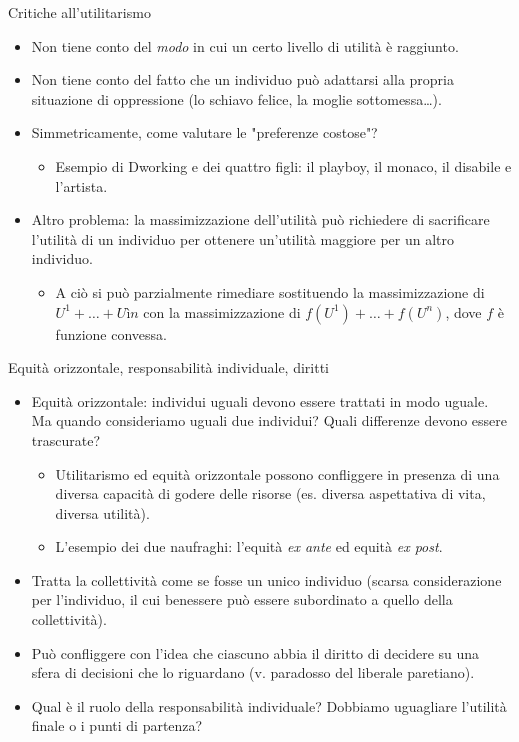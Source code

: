 \documentclass[11pt]{beamer}
\begin{document}
\begin{frame}{Critiche all'utilitarismo}
\begin{itemize}
\item Non tiene conto del \emph{modo} in cui un certo livello di utilità è raggiunto.
\item Non tiene conto del fatto che un individuo può adattarsi alla propria
situazione di oppressione (lo schiavo felice, la moglie sottomessa\ldots{}).
\item Simmetricamente, come valutare le "preferenze costose"?
\begin{itemize}
\item Esempio di Dworking e dei quattro figli: il playboy, il monaco, il
disabile e l'artista.
\end{itemize}
\item Altro problema: la massimizzazione dell'utilità può richiedere di
sacrificare l'utilità di un individuo per ottenere un'utilità maggiore per
un altro individuo.
\begin{itemize}
\item A ciò si può parzialmente rimediare sostituendo la massimizzazione di
$U^1+\dots+Uìn$ con la massimizzazione di $f(U^1)+\dots+f(U^n)$, dove $f$
è funzione convessa.
\end{itemize}
\end{itemize}
\end{frame}

\begin{frame}{Equità orizzontale, responsabilità individuale, diritti}
\begin{itemize}
\item \alert{Equità orizzontale}: individui uguali devono essere trattati in modo
uguale. Ma quando consideriamo uguali due individui? Quali differenze
devono essere trascurate?
\begin{itemize}
\item Utilitarismo ed equità orizzontale possono confliggere in presenza di una
diversa capacità di godere delle risorse (es. diversa aspettativa di vita,
diversa utilità).
\item L'esempio dei due naufraghi: l'equità \emph{ex ante} ed equità \emph{ex post}.
\end{itemize}
\item Tratta la collettività come se fosse un unico individuo (scarsa
considerazione per l'individuo, il cui benessere può essere subordinato a
quello della collettività).
\item Può confliggere con l'idea che ciascuno abbia il diritto di decidere su una
sfera di decisioni che lo riguardano (v. paradosso del liberale paretiano).
\item Qual è il ruolo della responsabilità individuale? Dobbiamo uguagliare
l'utilità finale o i punti di partenza?
\end{itemize}
\end{frame}
\end{document}
